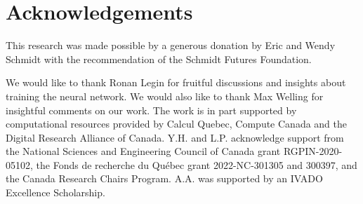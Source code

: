 \section*{Acknowledgements}

This research was made possible by a generous donation by Eric and Wendy Schmidt with the recommendation of the Schmidt Futures Foundation.

We would like to thank Ronan Legin for fruitful discussions and insights about training the neural network. We would also like to thank Max Welling for insightful comments on our work.  The work is in part supported by computational resources provided by Calcul Quebec, Compute Canada and the Digital Research Alliance of Canada. Y.H. and L.P. acknowledge support from the National Sciences and Engineering Council of Canada grant RGPIN-2020-05102, the Fonds de recherche du Québec grant 2022-NC-301305 and 300397, and the Canada Research Chairs Program. A.A. was supported by an IVADO Excellence Scholarship.


